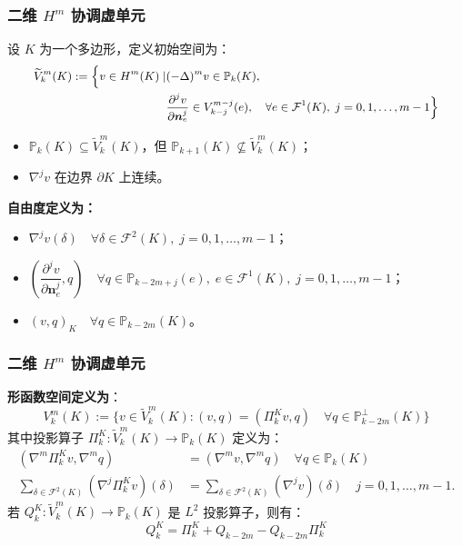 \documentclass[notheorems,serif]{beamer}
\begin{document}
\begin{frame}
\frametitle{二维 $H^m$ 协调虚单元}

设 $K$ 为一个多边形，定义初始空间为：
$$
\small{
\begin{aligned}
  \widetilde{V}_k^m(K) := \Big\{v \in H^m(K) \mid & (-\Delta)^m v \in \mathbb{P}_k(K),\\ 
      & \frac{\partial^j v}{\partial \boldsymbol{n}_e^j} \in V_{k-j}^{m-j}(e), \quad 
    \forall e \in \mathcal{F}^1(K),\; j=0,1,\dots,m-1 \Big\}
\end{aligned}
}
$$

\begin{itemize}
    \item $\mathbb{P}_k(K) \subseteq \widetilde{V}_k^m(K)$，但 
        $\mathbb{P}_{k+1}(K) \not\subseteq \widetilde{V}_k^m(K)$；
    \item $\nabla^j v$ 在边界 $\partial K$ 上连续。
\end{itemize}

\textbf{自由度定义为：}
\begin{itemize}
    \item $\nabla^{j}v(\delta) \quad \forall \delta \in \mathcal{F}^2(K),
        \; j = 0, 1, \dots, m-1$；
    \item $\left(\dfrac{\partial^j v}{\partial \boldsymbol{n}_e^j}, q\right) \quad 
        \forall q \in \mathbb{P}_{k-2m+j}(e), \; e \in \mathcal{F}^1(K), \; 
        j = 0, 1, \dots, m-1$；
    \item $(v, q)_K \quad \forall q \in \mathbb{P}_{k-2m}(K)$。
\end{itemize}
\end{frame}

\begin{frame}
\frametitle{二维 $H^m$ 协调虚单元}
    \textbf{形函数空间定义为}：
    $$
    V_k^m(K) := \{v \in \widetilde{V}_k^m(K): (v, q) = (\Pi_k^Kv, q) \quad 
        \forall q \in \mathbb{P}_{k-2m}^{\perp}(K)\}
    $$
    其中投影算子 $\Pi_k^K : \widetilde{V}_k^m(K) \to \mathbb{P}_k(K)$ 定义为：
    $$
    \begin{aligned}
        (\nabla^m \Pi_k^K v, \nabla^m q) &  = (\nabla^m v, \nabla^m q) \quad
        \forall q \in \mathbb{P}_k(K)\\
        \sum_{\delta\in\mathcal{F}^2(K)}(\nabla^j\Pi_k^K v)(\delta) & = 
        \sum_{\delta\in\mathcal{F}^2(K)}(\nabla^j v)(\delta) \quad j = 0, 1,
        \dots, m-1.
    \end{aligned}
    $$
    若 $Q_k^K : \widetilde{V}_k^m(K) \to \mathbb{P}_k(K)$ 是 $L^2$ 投影算子，则有：
    $$
    Q_k^K = \Pi_k^K + Q_{k-2m} - Q_{k-2m}\Pi_k^K 
    $$
\end{frame}
\end{document}
